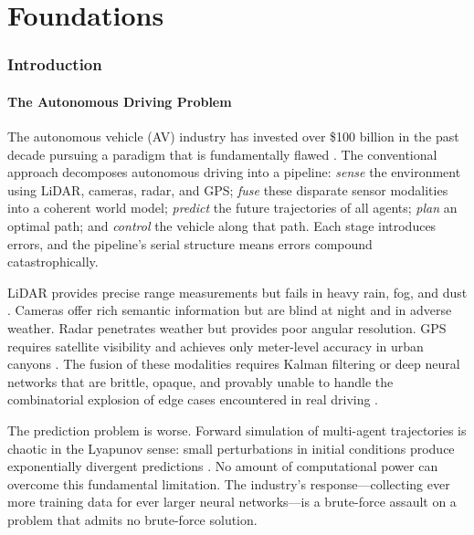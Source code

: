 \documentclass[12pt]{article}
\theoremstyle{definition}
\theoremstyle{remark}
\begin{document}
\part{Foundations}
\label{part:foundations}

\section{Introduction}
\label{sec:introduction}

\subsection{The Autonomous Driving Problem}

The autonomous vehicle (AV) industry has invested over \$100 billion in the past decade pursuing a paradigm that is fundamentally flawed \cite{thrun2006stanley, schwarting2018planning, bojarski2016end}. The conventional approach decomposes autonomous driving into a pipeline: \emph{sense} the environment using LiDAR, cameras, radar, and GPS; \emph{fuse} these disparate sensor modalities into a coherent world model; \emph{predict} the future trajectories of all agents; \emph{plan} an optimal path; and \emph{control} the vehicle along that path. Each stage introduces errors, and the pipeline's serial structure means errors compound catastrophically.

LiDAR provides precise range measurements but fails in heavy rain, fog, and dust \cite{kaplan2017understanding}. Cameras offer rich semantic information but are blind at night and in adverse weather. Radar penetrates weather but provides poor angular resolution. GPS requires satellite visibility and achieves only meter-level accuracy in urban canyons \cite{kaplan2017understanding}. The fusion of these modalities requires Kalman filtering or deep neural networks that are brittle, opaque, and provably unable to handle the combinatorial explosion of edge cases encountered in real driving \cite{schwarting2018planning}.

The prediction problem is worse. Forward simulation of multi-agent trajectories is chaotic in the Lyapunov sense: small perturbations in initial conditions produce exponentially divergent predictions \cite{helbing2001traffic}. No amount of computational power can overcome this fundamental limitation. The industry's response---collecting ever more training data for ever larger neural networks---is a brute-force assault on a problem that admits no brute-force solution.
\end{document}
